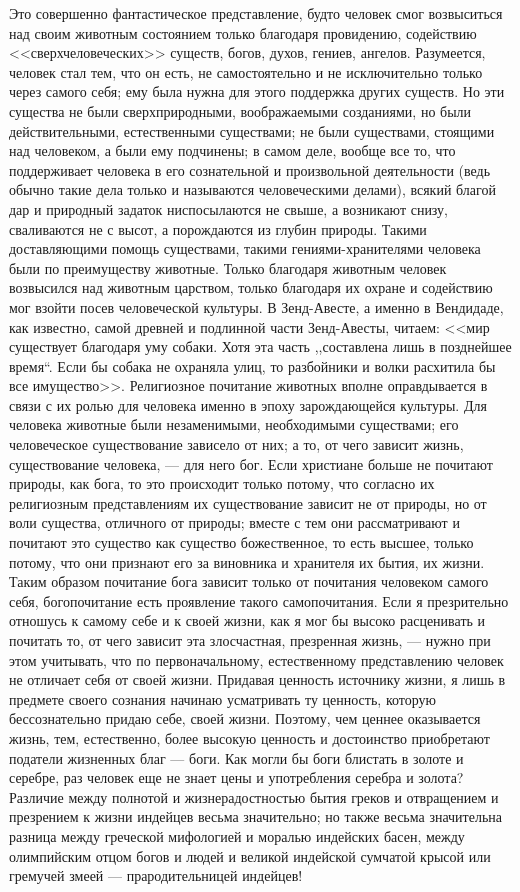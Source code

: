 \documentclass[12pt,oneside]{book}
\begin{document}
Это совершенно фантастическое представление, будто человек смог возвыситься над своим животным состоянием только благодаря провидению, содействию <<сверхчеловеческих>> существ, богов, духов, гениев, ангелов. Разумеется, человек стал тем, что он есть, не самостоятельно и не исключительно только через самого себя; ему была нужна для этого поддержка других существ. Но эти существа не были сверхприродными, воображаемыми созданиями, но были действительными, естественными существами; не были существами, стоящими над человеком, а были ему подчинены; в самом деле, вообще все то, что поддерживает человека в его сознательной и произвольной деятельности (ведь обычно такие дела только и называются человеческими делами), всякий благой дар и природный задаток ниспосылаются не свыше, а возникают снизу, сваливаются не с высот, а порождаются из глубин природы. Такими доставляющими помощь существами, такими гениями-хранителями человека были по преимуществу животные. Только благодаря животным человек возвысился над животным царством, только благодаря их охране и содействию мог взойти посев человеческой культуры. В Зенд-Авесте, а именно в Вендидаде, как известно, самой древней и подлинной части Зенд-Авесты, читаем: <<мир существует благодаря уму собаки. Хотя эта часть ,,составлена лишь в позднейшее время``. Если бы собака не охраняла улиц, то разбойники и волки расхитила бы все имущество>>. Религиозное почитание животных вполне оправдывается в связи с их ролью для человека именно в эпоху зарождающейся культуры. Для человека животные были незаменимыми, необходимыми существами; его человеческое существование зависело от них; а то, от чего зависит жизнь, существование человека, --- для него бог. Если христиане больше не почитают природы, как бога, то это происходит только потому, что согласно их религиозным представлениям их существование зависит не от природы, но от воли существа, отличного от природы; вместе с тем они рассматривают и почитают это существо как существо божественное, то есть высшее, только потому, что они признают его за виновника и хранителя их бытия, их жизни. Таким образом почитание бога зависит только от почитания человеком самого себя, богопочитание есть проявление такого самопочитания. Если я презрительно отношусь к самому себе и к своей жизни, как я мог бы высоко расценивать и почитать то, от чего зависит эта злосчастная, презренная жизнь, --- нужно при этом учитывать, что по первоначальному, естественному представлению человек не отличает себя от своей жизни. Придавая ценность источнику жизни, я лишь в предмете своего сознания начинаю усматривать ту ценность, которую бессознательно придаю себе, своей жизни. Поэтому, чем ценнее оказывается жизнь, тем, естественно, более высокую ценность и достоинство приобретают податели жизненных благ --- боги. Как могли бы боги блистать в золоте и серебре, раз человек еще не знает цены и употребления серебра и золота? Различие между полнотой и жизнерадостностью бытия греков и отвращением и презрением к жизни индейцев весьма значительно; но также весьма значительна разница между греческой мифологией и моралью индейских басен, между олимпийским отцом богов и людей и великой индейской сумчатой крысой или гремучей змеей --- прародительницей индейцев!
\end{document}
